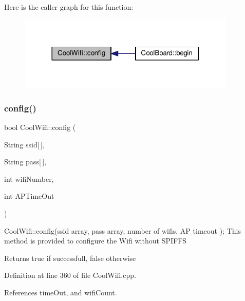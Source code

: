 Here is the caller graph for this function\+:\nopagebreak
\begin{figure}[H]
\begin{center}
\leavevmode
\includegraphics[width=294pt]{classCoolWifi_a4eb2f6b9b09dd588964b88b6c70122c0_icgraph}
\end{center}
\end{figure}
\mbox{\label{classCoolWifi_a871d4a0d9978f17fdf6d874fc2958b6c}} 
\subsubsection{\texorpdfstring{config()}{config()}\hspace{0.1cm}{\footnotesize\ttfamily [2/2]}}
{\footnotesize\ttfamily bool Cool\+Wifi\+::config (\begin{DoxyParamCaption}\item[{String}]{ssid\mbox{[}$\,$\mbox{]},  }\item[{String}]{pass\mbox{[}$\,$\mbox{]},  }\item[{int}]{wifi\+Number,  }\item[{int}]{A\+P\+Time\+Out }\end{DoxyParamCaption})}

Cool\+Wifi\+::config(ssid array, pass array, number of wifis, A\+P timeout ); This method is provided to configure the Wifi without S\+P\+I\+F\+FS

\begin{DoxyReturn}{Returns}
true if successfull, false otherwise 
\end{DoxyReturn}


Definition at line 360 of file Cool\+Wifi.\+cpp.



References time\+Out, and wifi\+Count.


